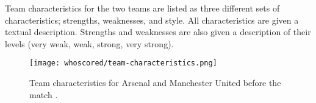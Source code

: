 Team characteristics for the two teams are listed as three different sets of characteristics; strengths, weaknesses, and style. All characteristics are given a textual description. Strengths and weaknesses are also given a description of their levels (very weak, weak, strong, very strong).
\begin{figure}[H]
    \centering
    \texttt{[image: whoscored/team-characteristics.png]}
    \caption{Team characteristics for Arsenal and Manchester United before the match .}
    \label{fig:whoscored-team-characteristics}
\end{figure}


\iffalse
\subsection{Team data}

Team URLs are of the following form:

\whoscoredurl{/Teams/ID/VIEW},

where \textbf{ID} is the team ID, and \textbf{VIEW} is the current view. A team has different views, depending on whether it is competing in a detailed competition or not. The different views are listed in \refertable{tab:whoscored-team-views}.


\subsection{Player data}

Player URLs are of the following form:

\whoscoredurl{/Players/ID/VIEW},

where \textbf{ID} is the player ID, and \textbf{VIEW} is the current view. A player has different views, depending on whether it is competing in a detailed competition or not. The different views are listed in \refertable{tab:whoscored-player-views}.
\fi
